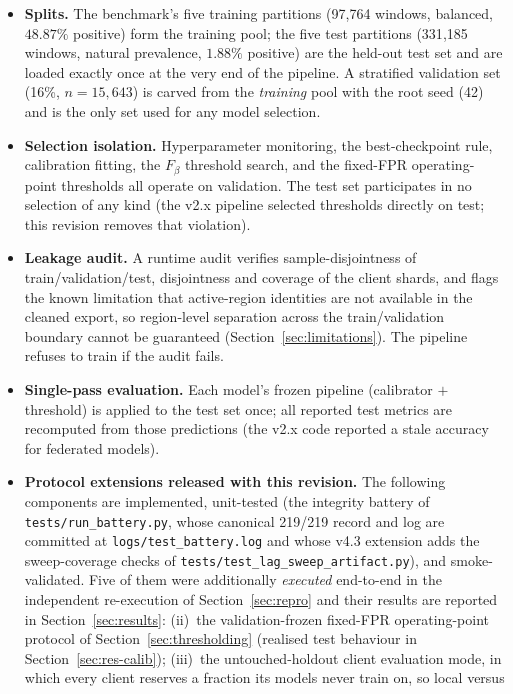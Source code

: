 \begin{itemize}[leftmargin=1.4em,itemsep=1pt]
\item \textbf{Splits.} The benchmark's five training partitions
(97{,}764 windows, balanced, $48.87\%$ positive) form the training pool;
the five test partitions (331{,}185 windows, natural prevalence,
$1.88\%$ positive) are the held-out test set and are loaded exactly
once at the very end of the pipeline. A stratified validation set
(16\%, $n{=}15{,}643$) is carved from the \emph{training} pool with the
root seed (42) and is the only set used for any model selection.
\item \textbf{Selection isolation.} Hyperparameter monitoring, the
best-checkpoint rule, calibration fitting, the $F_\beta$ threshold
search, and the fixed-FPR operating-point thresholds all operate on
validation. The test set participates in no selection of any kind
(the v2.x pipeline selected thresholds directly on test; this
revision removes that violation).
\item \textbf{Leakage audit.} A runtime audit verifies
sample-disjointness of train/validation/test, disjointness and coverage
of the client shards, and flags the known limitation that
active-region identities are not available in the cleaned export, so
region-level separation across the train/validation boundary cannot be
guaranteed (Section~\ref{sec:limitations}). The pipeline refuses to
train if the audit fails.
\item \textbf{Single-pass evaluation.} Each model's frozen pipeline
(calibrator $+$ threshold) is applied to the test set once; all
reported test metrics are recomputed from those predictions (the v2.x
code reported a stale accuracy for federated models).
\item \textbf{Protocol extensions released with this revision.} The
following components are implemented, unit-tested (the integrity
battery of \texttt{tests/run\_battery.py}, whose canonical 219/219
record and log are committed at \texttt{logs/test\_battery.log} and
whose v4.3 extension adds the sweep-coverage checks of
\texttt{tests/test\_lag\_sweep\_artifact.py}), and smoke-validated. Five of them were additionally
\emph{executed} end-to-end in the independent re-execution of
Section~\ref{sec:repro} and their results are reported in
Section~\ref{sec:results}: (ii)\ the validation-frozen fixed-FPR
operating-point protocol of Section~\ref{sec:thresholding} (realised
test behaviour in Section~\ref{sec:res-calib}); (iii)\ the
untouched-holdout client evaluation mode, in which every client
reserves a fraction its models never train on, so local versus

\end{itemize}
